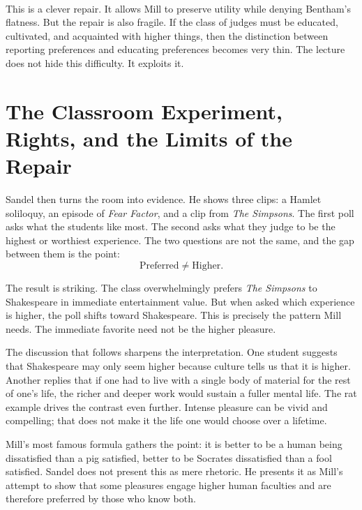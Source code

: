 \paragraph{}
This is a clever repair. It allows Mill to preserve utility while denying Bentham's flatness. But the repair is also fragile. If the class of judges must be educated, cultivated, and acquainted with higher things, then the distinction between reporting preferences and educating preferences becomes very thin. The lecture does not hide this difficulty. It exploits it.

\section{The Classroom Experiment, Rights, and the Limits of the Repair}

Sandel then turns the room into evidence. He shows three clips: a Hamlet soliloquy, an episode of \emph{Fear Factor}, and a clip from \emph{The Simpsons}. The first poll asks what the students like most. The second asks what they judge to be the highest or worthiest experience. The two questions are not the same, and the gap between them is the point:
\begin{equation}
\text{Preferred} \neq \text{Higher}.
\end{equation}

The result is striking. The class overwhelmingly prefers \emph{The Simpsons} to Shakespeare in immediate entertainment value. But when asked which experience is higher, the poll shifts toward Shakespeare. This is precisely the pattern Mill needs. The immediate favorite need not be the higher pleasure.

The discussion that follows sharpens the interpretation. One student suggests that Shakespeare may only seem higher because culture tells us that it is higher. Another replies that if one had to live with a single body of material for the rest of one's life, the richer and deeper work would sustain a fuller mental life. The rat example drives the contrast even further. Intense pleasure can be vivid and compelling; that does not make it the life one would choose over a lifetime.

Mill's most famous formula gathers the point: it is better to be a human being dissatisfied than a pig satisfied, better to be Socrates dissatisfied than a fool satisfied. Sandel does not present this as mere rhetoric. He presents it as Mill's attempt to show that some pleasures engage higher human faculties and are therefore preferred by those who know both.

